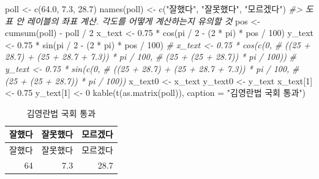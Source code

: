 \documentclass[
]{article}
\newenvironment{Shaded}{\begin{snugshade}}{\end{snugshade}}
\newcommand{\AttributeTok}[1]{\textcolor[rgb]{0.77,0.63,0.00}{#1}}
\newcommand{\CommentTok}[1]{\textcolor[rgb]{0.56,0.35,0.01}{\textit{#1}}}
\newcommand{\DecValTok}[1]{\textcolor[rgb]{0.00,0.00,0.81}{#1}}
\newcommand{\FloatTok}[1]{\textcolor[rgb]{0.00,0.00,0.81}{#1}}
\newcommand{\FunctionTok}[1]{\textcolor[rgb]{0.00,0.00,0.00}{#1}}
\newcommand{\NormalTok}[1]{#1}
\newcommand{\OtherTok}[1]{\textcolor[rgb]{0.56,0.35,0.01}{#1}}
\newcommand{\SpecialCharTok}[1]{\textcolor[rgb]{0.00,0.00,0.00}{#1}}
\newcommand{\StringTok}[1]{\textcolor[rgb]{0.31,0.60,0.02}{#1}}
\begin{document}
\begin{Shaded}
\begin{Highlighting}[]
\NormalTok{poll }\OtherTok{\textless{}{-}} \FunctionTok{c}\NormalTok{(}\FloatTok{64.0}\NormalTok{, }\FloatTok{7.3}\NormalTok{, }\FloatTok{28.7}\NormalTok{)}
\FunctionTok{names}\NormalTok{(poll) }\OtherTok{\textless{}{-}} \FunctionTok{c}\NormalTok{(}\StringTok{"잘했다"}\NormalTok{, }\StringTok{"잘못했다"}\NormalTok{, }\StringTok{"모르겠다"}\NormalTok{)}
\CommentTok{\#\textgreater{} 도표 안 레이블의 좌표 계산. 각도를 어떻게 계산하는지 유의할 것}
\NormalTok{pos }\OtherTok{\textless{}{-}} \FunctionTok{cumsum}\NormalTok{(poll) }\SpecialCharTok{{-}}\NormalTok{ poll }\SpecialCharTok{/} \DecValTok{2}
\NormalTok{x\_text }\OtherTok{\textless{}{-}} \FloatTok{0.75} \SpecialCharTok{*} \FunctionTok{cos}\NormalTok{(pi }\SpecialCharTok{/} \DecValTok{2} \SpecialCharTok{{-}}\NormalTok{ (}\DecValTok{2} \SpecialCharTok{*}\NormalTok{ pi) }\SpecialCharTok{*}\NormalTok{ pos }\SpecialCharTok{/} \DecValTok{100}\NormalTok{)}
\NormalTok{y\_text }\OtherTok{\textless{}{-}} \FloatTok{0.75} \SpecialCharTok{*} \FunctionTok{sin}\NormalTok{(pi }\SpecialCharTok{/} \DecValTok{2} \SpecialCharTok{{-}}\NormalTok{ (}\DecValTok{2} \SpecialCharTok{*}\NormalTok{ pi) }\SpecialCharTok{*}\NormalTok{ pos }\SpecialCharTok{/} \DecValTok{100}\NormalTok{)}
\CommentTok{\# x\_text \textless{}{-} 0.75 * cos(c(0, }
\CommentTok{\#                        ((25 + 28.7) + (25 + 28.7 + 7.3)) * pi / 100, }
\CommentTok{\#                        (25 + (25 + 28.7)) * pi / 100))}
\CommentTok{\# y\_text \textless{}{-} 0.75 * sin(c(0, }
\CommentTok{\#                        ((25 + 28.7) + (25 + 28.7 + 7.3)) * pi / 100, }
\CommentTok{\#                        (25 + (25 + 28.7)) * pi / 100))}
\NormalTok{x\_text0 }\OtherTok{\textless{}{-}}\NormalTok{ x\_text}
\NormalTok{y\_text0 }\OtherTok{\textless{}{-}}\NormalTok{ y\_text}
\NormalTok{x\_text[}\DecValTok{1}\NormalTok{] }\OtherTok{\textless{}{-}} \FloatTok{0.75}
\NormalTok{y\_text[}\DecValTok{1}\NormalTok{] }\OtherTok{\textless{}{-}} \DecValTok{0}
\FunctionTok{kable}\NormalTok{(}\FunctionTok{t}\NormalTok{(}\FunctionTok{as.matrix}\NormalTok{(poll)), }\AttributeTok{caption =} \StringTok{"김영란법 국회 통과"}\NormalTok{)}
\end{Highlighting}
\end{Shaded}

\begin{longtable}[]{@{}rrr@{}}
\caption{김영란법 국회 통과}\tabularnewline
\toprule
잘했다 & 잘못했다 & 모르겠다\tabularnewline
\midrule
\endfirsthead
\toprule
잘했다 & 잘못했다 & 모르겠다\tabularnewline
\midrule
\endhead
64 & 7.3 & 28.7\tabularnewline
\bottomrule
\end{longtable}
\end{document}
